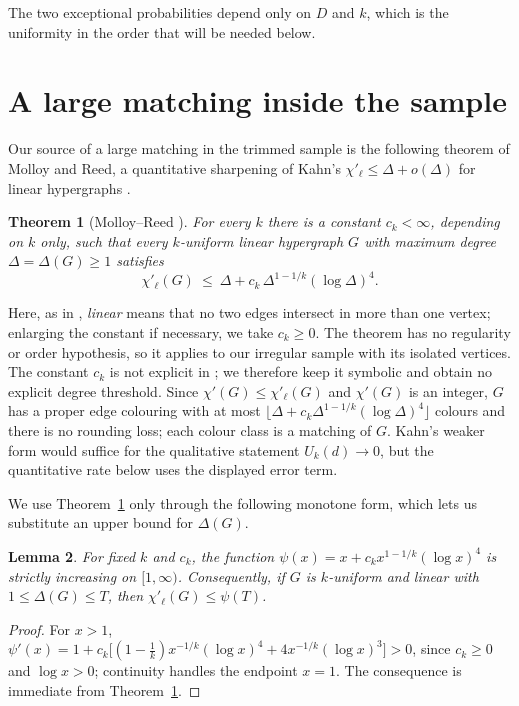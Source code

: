 \documentclass[11pt,a4paper]{amsart}
\theoremstyle{plain}
\newtheorem{theorem}{Theorem}[section]
\newtheorem{lemma}[theorem]{Lemma}
\theoremstyle{definition}
\theoremstyle{remark}
\newcommand{\chil}{\chi'_{\ell}}
\newcommand{\Deltaop}{\Delta}
\begin{document}
The two exceptional probabilities depend only on $D$ and $k$, which is the uniformity in
the order that will be needed below.

\section{A large matching inside the sample}
\label{sec:colour}

Our source of a large matching in the trimmed sample is the following theorem of Molloy and
Reed, a quantitative sharpening of Kahn's $\chil\le\Delta+o(\Delta)$ for linear hypergraphs
\cite{Kahn96}.

\begin{theorem}[Molloy--Reed {\cite[Theorem 1]{MolloyReed}}]
\label{thm:MR}
For every $k$ there is a constant $c_k<\infty$, depending on $k$ only, such that every
$k$-uniform linear hypergraph $G$ with maximum degree $\Delta=\Deltaop(G)\ge1$ satisfies
\[
  \chil(G)\ \le\ \Delta+c_k\,\Delta^{1-1/k}(\log\Delta)^4 .
\]
\end{theorem}

Here, as in \cite[\S1]{MolloyReed}, \emph{linear} means that no two edges intersect in more
than one vertex; enlarging the constant if necessary, we take $c_k\ge0$. The theorem has
no regularity or order hypothesis, so it applies to our irregular sample with its isolated
vertices. The constant $c_k$ is not explicit in \cite{MolloyReed}; we therefore keep it
symbolic and obtain no explicit degree threshold. Since $\chi'(G)\le\chil(G)$ and $\chi'(G)$ is an integer, $G$ has a proper edge colouring
with at most $\lfloor\Delta+c_k\Delta^{1-1/k}(\log\Delta)^4\rfloor$ colours and there is no
rounding loss; each colour class is a matching of $G$. Kahn's weaker form would suffice for
the qualitative statement $U_k(d)\to0$, but the quantitative rate below uses the displayed
error term.

We use Theorem~\ref{thm:MR} only through the following monotone form, which lets us
substitute an upper bound for $\Delta(G)$.

\begin{lemma}
\label{lem:MRmono}
For fixed $k$ and $c_k$, the function $\psi(x)=x+c_k x^{1-1/k}(\log x)^4$ is strictly
increasing on $[1,\infty)$. Consequently, if $G$ is $k$-uniform and linear with
$1\le\Deltaop(G)\le T$, then $\chil(G)\le\psi(T)$.
\end{lemma}

\begin{proof}
For $x>1$,
$\psi'(x)=1+c_k\bigl[(1-\tfrac1k)x^{-1/k}(\log x)^4+4x^{-1/k}(\log x)^3\bigr]>0$,
since $c_k\ge0$ and $\log x>0$; continuity handles the endpoint $x=1$. The consequence
is immediate from Theorem~\ref{thm:MR}.
\end{proof}
\end{document}

